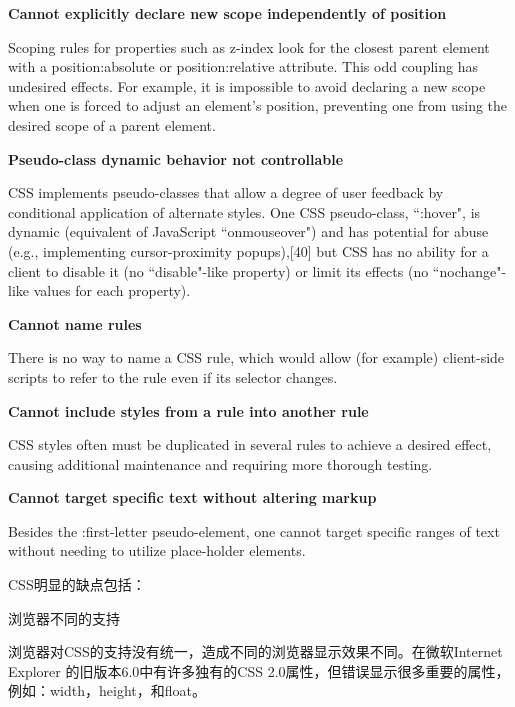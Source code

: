 \begin{compactitem}
\item \textbf{Cannot explicitly declare new scope independently of position}

Scoping rules for properties such as z-index look for the closest parent element with a position:absolute or position:relative attribute. This odd coupling has undesired effects. For example, it is impossible to avoid declaring a new scope when one is forced to adjust an element's position, preventing one from using the desired scope of a parent element.

\item \textbf{Pseudo-class dynamic behavior not controllable}

CSS implements pseudo-classes that allow a degree of user feedback by conditional application of alternate styles. One CSS pseudo-class, ``:hover", is dynamic (equivalent of JavaScript ``onmouseover") and has potential for abuse (e.g., implementing cursor-proximity popups),[40] but CSS has no ability for a client to disable it (no ``disable"-like property) or limit its effects (no ``nochange"-like values for each property).

\item \textbf{Cannot name rules}

There is no way to name a CSS rule, which would allow (for example) client-side scripts to refer to the rule even if its selector changes.

\item \textbf{Cannot include styles from a rule into another rule}

CSS styles often must be duplicated in several rules to achieve a desired effect, causing additional maintenance and requiring more thorough testing.

\item \textbf{Cannot target specific text without altering markup}

Besides the :first-letter pseudo-element, one cannot target specific ranges of text without needing to utilize place-holder elements.
\end{compactitem}


CSS明显的缺点包括：

\begin{compactitem}
\item 浏览器不同的支持
\end{compactitem}

浏览器对CSS的支持没有统一，造成不同的浏览器显示效果不同。在微软Internet Explorer 的旧版本6.0中有许多独有的CSS 2.0属性，但错误显示很多重要的属性，例如：width，height，和float。

